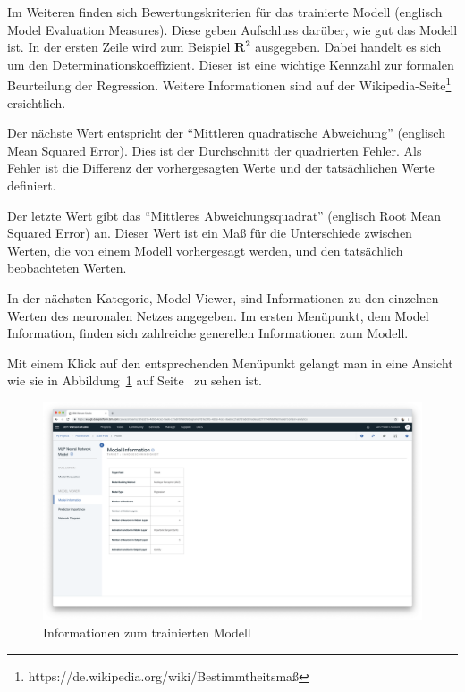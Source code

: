 Im Weiteren finden sich Bewertungskriterien für das trainierte Modell (englisch Model Evaluation Measures). Diese geben
Aufschluss darüber, wie gut das Modell ist. In der ersten Zeile wird zum Beispiel $\mathbf{R^2}$ ausgegeben.  Dabei
handelt es sich um den Determinationskoeffizient. Dieser ist eine wichtige Kennzahl zur formalen Beurteilung der
Regression. Weitere Informationen sind auf der Wikipedia-Seite\footnote{https://de.wikipedia.org/wiki/Bestimmtheitsmaß}
ersichtlich.

Der nächste Wert entspricht der \enquote{Mittleren quadratische Abweichung} (englisch Mean Squared Error). Dies ist der
Durchschnitt der quadrierten Fehler. Als Fehler ist die Differenz der vorhergesagten Werte und der tatsächlichen Werte
definiert.

Der letzte Wert gibt das \enquote{Mittleres Abweichungsquadrat} (englisch Root Mean Squared Error) an. Dieser Wert ist
ein Maß für die Unterschiede zwischen Werten, die von einem Modell vorhergesagt werden, und den tatsächlich beobachteten
Werten.

In der nächsten Kategorie, Model Viewer, sind Informationen zu den einzelnen Werten des neuronalen Netzes angegeben.
Im ersten Menüpunkt, dem Model Information, finden sich zahlreiche generellen Informationen zum Modell.

Mit einem Klick auf den entsprechenden Menüpunkt gelangt man in eine Ansicht wie sie in
Abbildung~\ref{fig:umsetzung_model_information} auf Seite~\pageref{fig:umsetzung_model_information} zu sehen ist.

\begin{figure}[h]
    \centering
    \includegraphics[width=\textwidth]{images/kapitel_3/model_information.png}
    \caption{Informationen zum trainierten Modell}
    \label{fig:umsetzung_model_information}
\end{figure}


